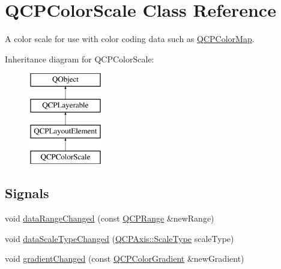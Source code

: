 \hypertarget{class_q_c_p_color_scale}{}\section{Q\+C\+P\+Color\+Scale Class Reference}
\label{class_q_c_p_color_scale}


A color scale for use with color coding data such as \hyperlink{class_q_c_p_color_map}{Q\+C\+P\+Color\+Map}.  


Inheritance diagram for Q\+C\+P\+Color\+Scale\+:\begin{figure}[H]
\begin{center}
\leavevmode
\includegraphics[height=4.000000cm]{class_q_c_p_color_scale}
\end{center}
\end{figure}
\subsection*{Signals}
\begin{DoxyCompactItemize}
\item 
void \hyperlink{class_q_c_p_color_scale_a685717490a6aa83c5e711a4f34e837f9}{data\+Range\+Changed} (const \hyperlink{class_q_c_p_range}{Q\+C\+P\+Range} \&new\+Range)
\item 
void \hyperlink{class_q_c_p_color_scale_a61558b962f7791ff2f15a565dcf60181}{data\+Scale\+Type\+Changed} (\hyperlink{class_q_c_p_axis_a36d8e8658dbaa179bf2aeb973db2d6f0}{Q\+C\+P\+Axis\+::\+Scale\+Type} scale\+Type)
\item 
void \hyperlink{class_q_c_p_color_scale_a5e5f8c5626242c8f7308bfab74d3d989}{gradient\+Changed} (const \hyperlink{class_q_c_p_color_gradient}{Q\+C\+P\+Color\+Gradient} \&new\+Gradient)
\end{DoxyCompactItemize}
